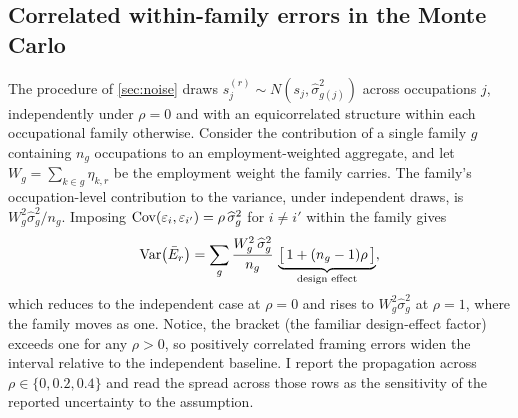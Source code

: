 \subsection{Correlated within-family errors in the Monte Carlo}

The procedure of \cref{sec:noise} draws $s^{(r)}_j \sim N(s_j, \widehat{\sigma}^2_{g(j)})$ across occupations $j$, independently under $\rho = 0$ and with an equicorrelated structure within each occupational family otherwise. Consider the contribution of a single family $g$ containing $n_g$ occupations to an employment-weighted aggregate, and let $W_g = \sum_{k \in g} \eta_{k,r}$ be the employment weight the family carries. The family's occupation-level contribution to the variance, under independent draws, is $W_g^2 \widehat{\sigma}^2_g / n_g$. Imposing $\operatorname{Cov}(\varepsilon_i, \varepsilon_{i'}) = \rho\,\widehat{\sigma}^2_g$ for $i \ne i'$ within the family gives
\begin{equation}\label{eq:A11}
\operatorname{Var}\bigl(\bar{E}_r\bigr)
= \sum_g \frac{W_g^2\, \widehat{\sigma}^2_g}{n_g}
\, \underbrace{\bigl[\, 1 + (n_g - 1)\rho \,\bigr]}_{\text{design effect}} ,
\end{equation}
which reduces to the independent case at $\rho = 0$ and rises to $W_g^2 \widehat{\sigma}^2_g$ at $\rho = 1$, where the family moves as one. Notice, the bracket (the familiar design-effect factor) exceeds one for any $\rho > 0$, so positively correlated framing errors widen the interval relative to the independent baseline. I report the propagation across $\rho \in \{0, 0.2, 0.4\}$ and read the spread across those rows as the sensitivity of the reported uncertainty to the assumption. 
